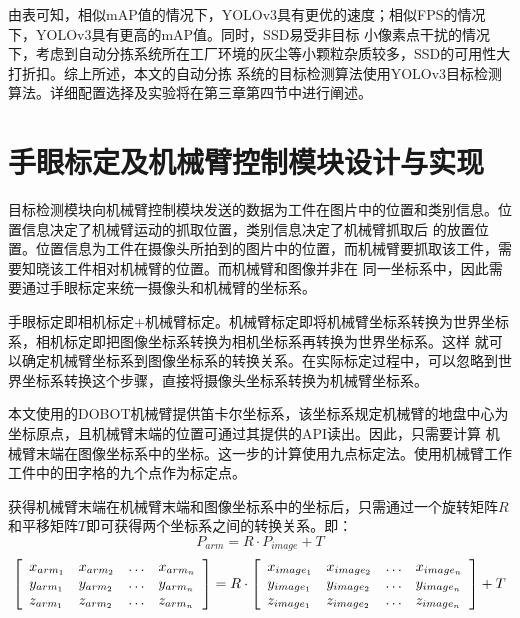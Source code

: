 由表可知，相似mAP值的情况下，YOLOv3具有更优的速度；相似FPS的情况下，YOLOv3具有更高的mAP值。同时，SSD易受非目标
小像素点干扰的情况下，考虑到自动分拣系统所在工厂环境的灰尘等小颗粒杂质较多，SSD的可用性大打折扣。综上所述，本文的自动分拣
系统的目标检测算法使用YOLOv3目标检测算法。详细配置选择及实验将在第三章第四节中进行阐述。


\section{手眼标定及机械臂控制模块设计与实现}

目标检测模块向机械臂控制模块发送的数据为工件在图片中的位置和类别信息。位置信息决定了机械臂运动的抓取位置，类别信息决定了机械臂抓取后
的放置位置。位置信息为工件在摄像头所拍到的图片中的位置，而机械臂要抓取该工件，需要知晓该工件相对机械臂的位置。而机械臂和图像并非在
同一坐标系中，因此需要通过手眼标定来统一摄像头和机械臂的坐标系。

手眼标定即相机标定+机械臂标定。机械臂标定即将机械臂坐标系转换为世界坐标系，相机标定即把图像坐标系转换为相机坐标系再转换为世界坐标系。这样
就可以确定机械臂坐标系到图像坐标系的转换关系。在实际标定过程中，可以忽略到世界坐标系转换这个步骤，直接将摄像头坐标系转换为机械臂坐标系。

本文使用的DOBOT机械臂提供笛卡尔坐标系，该坐标系规定机械臂的地盘中心为坐标原点，且机械臂末端的位置可通过其提供的API读出。因此，只需要计算
机械臂末端在图像坐标系中的坐标。这一步的计算使用九点标定法。使用机械臂工作工件中的田字格的九个点作为标定点。


获得机械臂末端在机械臂末端和图像坐标系中的坐标后，只需通过一个旋转矩阵$R$和平移矩阵$T$即可获得两个坐标系之间的转换关系。即：
$$P _ { a r m } = R \cdot P _ { i m a g e } + T$$
\begin{equation}
    \centering
    \left[ \begin{array} { l l l l } { x _ { a r m _ { 1 } } } & { x _ { a r m _ { 2 } } } & { \dots } & { x _ { a r m _ { n } } } \\ { y _ { a r m _ { 1 } } } & { y _ { a r m _ { 2 } } } & { \dots } & { y _ { a r m _ { n } } } \\ { z _ { a r m _ { 1 } } } & { z _ { a r m _ { 2 } } } & { \dots } & { z _ { a r m _ { n } } } \end{array} \right] = R \cdot \left[ \begin{array} { l l l l } { x _ { i m a g e _ { 1 } } } & { x _ { i m a g e _ { 2 } } } & { \dots } & { x _ { i m a g e _ { n } } } \\ { y _ { i m a g e _ { 1 } } } & { y _ { i m a g e _ { 2 } } } & { \dots } & { y _ { i m a g e _ { n } } } \\ { z _ { i m a g e _ { 1 } } } & { z _ { i m a g e _ { 2 } } } & { \dots } & { z _ { i m a g e _ { n } } } \end{array} \right] + T
    \label{equation:loc_trans}
\end{equation}

